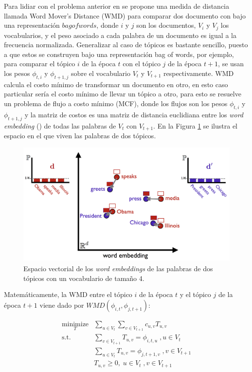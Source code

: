 \documentclass[letterpaper,12pt,oneside]{book} %
\begin{document}
Para lidiar con el problema anterior en \citep{kusner2015word} se propone una medida de distancia llamada Word Mover's Distance (WMD) para comparar dos documento con bajo una representación $bag of words$, donde $i$ y $j$ son los documentos, $V_{i}$ y $V_{j}$ los vocabularios, y el peso asociado a cada palabra de un documento  es igual a la frecuencia normalizada. Generalizar al caso de tópicos es bastante sencillo, puesto a que estos se construyen bajo una representación bag of words, por ejemplo, para comparar el tópico $i$ de la época $t$ con el tópico $j$ de la época $t+1$, se usan los pesos $\phi_{t,i}$ y $\phi_{t+1,j}$ sobre el vocabulario $V_{t}$ y $V_{t+1}$ respectivamente. WMD calcula el costo mínimo de transformar un documento en otro, en esto caso particular sería el costo mínimo de llevar un tópico a otro, para esto se resuelve un problema de flujo a costo mínimo (MCF), donde los flujos son los pesos $\phi_{t,i}$ y $\phi_{t+1,j}$ y la matriz de costos es una matriz de distancia euclidiana entre los \textit{word embedding} (\cite{mikolov2013distributed}) de todas las palabras de $V_{t}$ con $V_{t+1}$. En la Figura \ref{img:wmd_obama} se ilustra el espacio en el que viven las palabras de dos tópicos.

\begin{figure}
    \centering
\includegraphics[width=1\textwidth]{img/math/wmd-obama.png}
    \caption{Espacio vectorial de los \textit{word embeddings} de las palabras de dos tópicos con un vocabulario de tamaño 4.}
    \label{img:wmd_obama}
\end{figure}

Matemáticamente, la WMD entre el tópico $i$ de la época $t$ y el tópico $j$ de la época $t+1$ viene dado por $WMD(\phi_{i,t}, \phi_{j,t+1})$:

\begin{align}
\nonumber
\underset{T}{\text{minimize}}&\sum_{u \in V_{t}}\sum_{v \in V_{t+1}} c_{u,v}T_{u,v} \\ \nonumber
\textrm{s.t.}\qquad &\sum_{v \in V_{t+1}}T_{u,v}= \phi_{i,t,u} \;, u \in V_{t}\\ \nonumber
& \sum_{u \in V_{t}}T_{u,v}= \phi_{j,t+1,v} \;, v\in V_{t+1}\\ \nonumber
& T_{u,v} \geq 0,\; u \in V_{t} \;, v \in V_{t+1}\\ \nonumber
\end{align}
\end{document}
